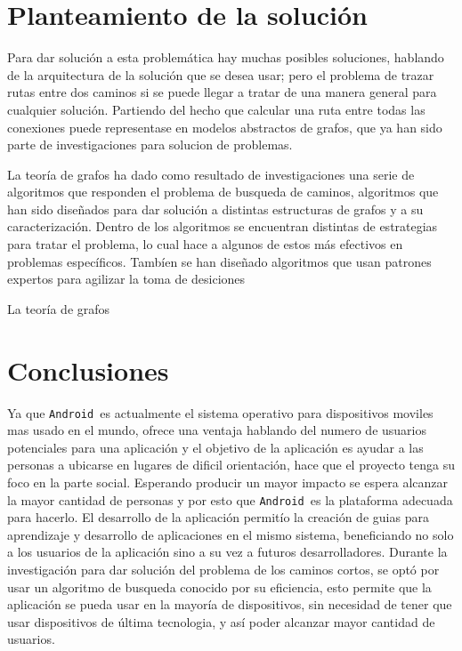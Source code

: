 \documentclass[journal]{IEEEtran}
\newcommand{\andr}{\texttt{Android~}}
\begin{document}
\section{Planteamiento de la solución}
Para dar solución a esta problemática hay muchas posibles soluciones, hablando de la arquitectura de la solución que se desea usar;
pero el problema de trazar rutas entre dos caminos
si se puede llegar a tratar de una manera general para cualquier solución. Partiendo del hecho que calcular una ruta entre todas las
conexiones puede representase en modelos
abstractos de grafos, que ya han sido parte de investigaciones para solucion de problemas.

La teoría de grafos ha dado como resultado de investigaciones una serie de algoritmos que responden el problema de busqueda de
caminos, algoritmos que han sido diseñados para dar
solución a distintas estructuras de grafos y a su caracterización. Dentro de los algoritmos se encuentran distintas de estrategias
para tratar el problema, lo cual hace a algunos de
estos más efectivos en problemas específicos. Tambíen se han diseñado algoritmos que usan patrones expertos para agilizar la toma de
desiciones

La teoría de grafos 

\section{Conclusiones}
Ya que \andr es actualmente el sistema operativo para dispositivos moviles mas usado en el mundo, ofrece una ventaja
hablando del numero de usuarios potenciales para una aplicación y el objetivo de la aplicación es ayudar a las personas a
ubicarse en lugares de dificil orientación, hace que el proyecto tenga su foco en la parte social. Esperando producir un
mayor impacto se espera alcanzar la mayor cantidad de personas y por esto que \andr es la plataforma adecuada para hacerlo.
El desarrollo de la aplicación permitío la creación de guias para aprendizaje y desarrollo de aplicaciones en el mismo
sistema, beneficiando no solo a los usuarios de la aplicación sino a su vez a futuros desarrolladores. Durante la
investigación para dar solución del problema de los caminos cortos, se optó por usar un algoritmo de busqueda conocido por
su eficiencia, esto permite que la aplicación se pueda usar en la mayoría de dispositivos, sin necesidad de tener que usar
dispositivos de última tecnologia, y así poder alcanzar mayor cantidad de usuarios.
\end{document}
